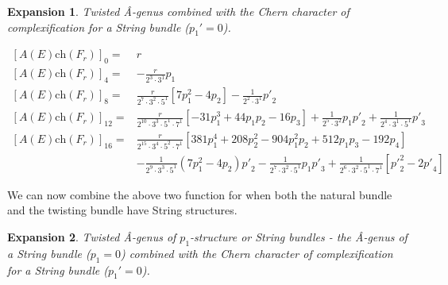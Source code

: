 \documentclass{amsart}
\theoremstyle{plain}
\newcommand{\ch}{\mathrm{ch}}
\numberwithin{equation}{section}
\newtheorem{ex}{Expansion}
\begin{document}
\begin{ex}
Twisted \^{A}-genus combined with the Chern character of complexification for a String bundle ($p_1'=0$).
\end{ex} 


\begin{tcolorbox}[text width=16cm, height=4.5cm,
title=\^{A}-genus twisted with a String bundle
]
{\footnotesize
\begin{align*} 
 {[A(E)\ch(F_r)]}_0 = &r
\\
 {[A(E)\ch(F_r)]}_4 = &-\tfrac{r}{2^3\cdot 3^1} p_1
\\
 {[A(E)\ch(F_r)]}_8 = &\tfrac{r}{2^7\cdot 3^2\cdot 5^1} [7 p_1^2-4 p_2]
-\tfrac{1}{2^2\cdot 3^1}  {p'}_2
\\
 {[A(E)\ch(F_r)]}_{12} = &\tfrac{r}{2^{10}\cdot 3^3\cdot 5^1\cdot 7^1}
  [-31 p_1^3+44 p_1 p_2-16 p_3]
  +\tfrac{1}{2^5\cdot 3^2} p_1  {p'}_2
  +\tfrac{1}{2^4\cdot 3^1\cdot 5^1} {p'}_3
\\
 {[A(E)\ch(F_r)]}_{16} = &\tfrac{r}{2^{15}\cdot 3^4\cdot 5^2\cdot 7^1}
  [381 p_1^4+208 p_2^2-904 p_1^2p_2+512 p_1p_3-192 p_4]
    \\
    & 
 -\tfrac{1}{2^9\cdot 3^3\cdot 5^1}(7 p_1^2-4 p_2)  {p'}_2
  -\tfrac{1}{2^7\cdot 3^2\cdot 5^1}p_1  {p'}_3
  +\tfrac{1}{2^6\cdot 3^2\cdot 5^1\cdot 7^1} [   {p'}_2^2- 2 {p'}_4]
\end{align*}
}
\end{tcolorbox}




We can now combine the above two function for when both the 
natural bundle and the twisting bundle have String structures. 



\begin{ex}
Twisted \^{A}-genus of $p_1$-structure or String bundles - the \^{A}-genus of a String bundle ($p_1=0$) combined with the Chern character of complexification for a String bundle ($p_1'=0$).
\end{ex} 

\end{document}
